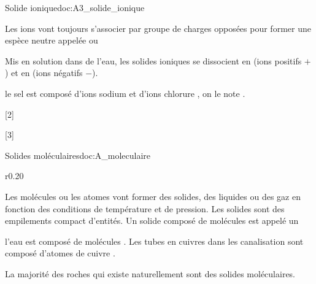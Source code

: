 \begin{doc}{Solide ionique}{doc:A3_solide_ionique}
  \begin{importants}
    Les ions vont toujours s'associer par groupe de charges opposées pour former une espèce neutre appelée  ou 
  \end{importants}
  
  Mis en solution dans de l'eau, les solides ioniques se dissocient en  (ions positifs $+$) et en  (ions négatifs $-$).
  
  \exemple le sel est composé d'ions sodium  et d'ions chlorure \chlorure, on le note .
\end{doc}

\pasCorrection{\newpage \vspace*{-30pt}}
[2]

[3]



\vspace*{-4pt}
\begin{doc}{Solides moléculaires}{doc:A_moleculaire}
  \begin{wrapfigure}{r}{0.20\linewidth}
    \vspace*{-32pt}
    \centering
  \end{wrapfigure}
  \strut\vspace*{-20pt}
  
  \begin{importants}
    Les molécules ou les atomes vont former des solides, des liquides ou des gaz en fonction des conditions de température et de pression.
    Les solides sont des empilements compact d'entités. Un solide composé de molécules est appelé un 
  \end{importants}
  \exemple* l'eau est composé de molécules .
  Les tubes en cuivres dans les canalisation sont composé d'atomes de cuivre .

  La majorité des roches qui existe naturellement sont des solides moléculaires.
\end{doc}

